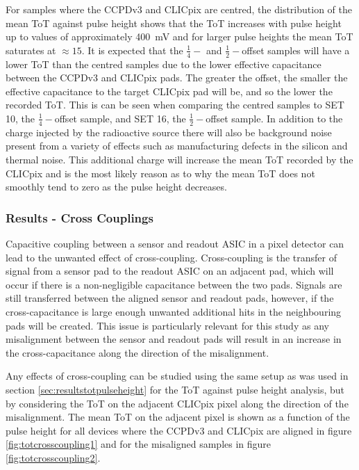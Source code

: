 For samples where the CCPDv3 and CLICpix are centred, the distribution of the mean ToT against pulse height shows that the ToT increases with pulse height up to values of approximately 400~mV and for larger pulse heights the mean ToT saturates at $\approx 15$.  It is expected that the $\frac{1}{4}-$ and $\frac{1}{2}-$offset samples will have a lower ToT than the centred samples due to the lower effective capacitance between the CCPDv3 and CLICpix pads.  The greater the offset, the smaller the effective capacitance to the target CLICpix pad will be, and so the lower the recorded ToT.  This is can be seen when comparing the centred samples to SET 10, the $\frac{1}{4}-$offset sample, and SET 16, the $\frac{1}{2}-$offset sample.  In addition to the charge injected by the radioactive source there will also be background noise present from a variety of effects such as manufacturing defects in the silicon and thermal noise.  This additional charge will increase the mean ToT recorded by the CLICpix and is the most likely reason as to why the mean ToT does not smoothly tend to zero as the pulse height decreases.


\subsubsection{Results - Cross Couplings}
Capacitive coupling between a sensor and readout ASIC in a pixel detector can lead to the unwanted effect of cross-coupling.  Cross-coupling is the transfer of signal from a sensor pad to the readout ASIC on an adjacent pad, which will occur if there is a non-negligible capacitance between the two pads.  Signals are still transferred between the aligned sensor and readout pads, however, if the cross-capacitance is large enough unwanted additional hits in the neighbouring pads will be created.  This issue is particularly relevant for this study as any misalignment between the sensor and readout pads will result in an increase in the cross-capacitance along the direction of the misalignment.   

Any effects of cross-coupling can be studied using the same setup as was used in section \ref{sec:resultstotpulseheight} for the ToT against pulse height analysis, but by considering the ToT on the adjacent CLICpix pixel along the direction of the misalignment.  The mean ToT on the adjacent pixel is shown as a function of the pulse height for all devices where the CCPDv3 and CLICpix are aligned in figure \ref{fig:totcrosscoupling1} and for the misaligned samples in figure \ref{fig:totcrosscoupling2}.

